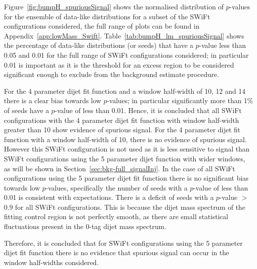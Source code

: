 Figure~\ref{fig:bumpH_spuriousSignal} shows the normalised distribution of \mbox{$p$-value}s for the ensemble of data-like distributions
for a subset of the SWiFt configurations considered, the full range of plots can be found in Appendix~\ref{app:lowMass_Swift}.
Table~\ref{tab:bumpH_lm_spuriousSignal} shows the percentage of data-like distributions (or seeds)
that have a \bh{} \mbox{$p$-value} less than %
0.05 and 0.01 for the full range of SWiFt configurations considered;
in particular 0.01 is important as it is the threshold for an excess region to be considered significant enough
to exclude from the background estimate procedure.

For the 4 parameter dijet fit function and a window half-width of 10, 12 and 14
there is a clear bias towards low \bh{} \mbox{$p$-value}s;
in particular significantly more than 1\% of seeds have a \bh{} \mbox{$p$-value} of less than 0.01.
Hence, it is concluded that all SWiFt configurations with the 4 parameter dijet fit function with window half-width greater than 10
show evidence of spurious signal.
For the 4 parameter dijet fit function with a window half-width of 10, there is no evidence of spurious signal.
However this SWiFt configuration is not used as it is less sensitive to signal than SWiFt configurations
using the 5 parameter dijet function with wider windows, as will be shown in Section~\ref{sec:bkg-full_signalInj}.
In the case of all SWiFt configurations using the 5 parameter dijet fit function
there is no significant bias towards low \bh{} \mbox{$p$-value}s,
specifically the number of seeds with a \bh{} \mbox{$p$-value} of less than 0.01 is consistent with expectations.
There is a deficit of seeds with a \bh{} $p$-value $>$ 0.9 for all SWiFt configurations.
This is because the dijet mass spectrum of the fitting control region is not perfectly smooth,
as there are small statistical fluctuations present in the 0-tag dijet mass spectrum.

Therefore, it is concluded that for SWiFt configurations using the 5 parameter dijet fit function
there is no evidence that spurious signal can occur in the window half-widths considered.

